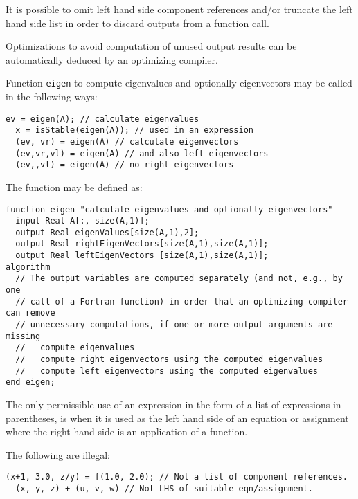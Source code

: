 It is possible to omit left hand side component references and/or
truncate the left hand side list in order to discard outputs from a
function call.

\begin{nonnormative}
Optimizations to avoid computation of unused output results can
be automatically deduced by an optimizing compiler.
\end{nonnormative}

\begin{example}
Function \lstinline!eigen! to compute eigenvalues and optionally
eigenvectors may be called in the following ways:
\begin{lstlisting}[language=modelica]
  ev = eigen(A); // calculate eigenvalues
  x = isStable(eigen(A)); // used in an expression
  (ev, vr) = eigen(A) // calculate eigenvectors
  (ev,vr,vl) = eigen(A) // and also left eigenvectors
  (ev,,vl) = eigen(A) // no right eigenvectors
\end{lstlisting}
The function may be defined as:
\begin{lstlisting}[language=modelica]
function eigen "calculate eigenvalues and optionally eigenvectors"
  input Real A[:, size(A,1)];
  output Real eigenValues[size(A,1),2];
  output Real rightEigenVectors[size(A,1),size(A,1)];
  output Real leftEigenVectors [size(A,1),size(A,1)];
algorithm
  // The output variables are computed separately (and not, e.g., by one
  // call of a Fortran function) in order that an optimizing compiler can remove
  // unnecessary computations, if one or more output arguments are missing
  //   compute eigenvalues
  //   compute right eigenvectors using the computed eigenvalues
  //   compute left eigenvectors using the computed eigenvalues
end eigen;
\end{lstlisting}
\end{example}

The only permissible use of an expression in the form of a list of
expressions in parentheses, is when it is used as the left hand side of
an equation or assignment where the right hand side is an application of
a function.

\begin{example}
The following are illegal:
\begin{lstlisting}[language=modelica]
  (x+1, 3.0, z/y) = f(1.0, 2.0); // Not a list of component references.
  (x, y, z) + (u, v, w) // Not LHS of suitable eqn/assignment.
\end{lstlisting}
\end{example}

